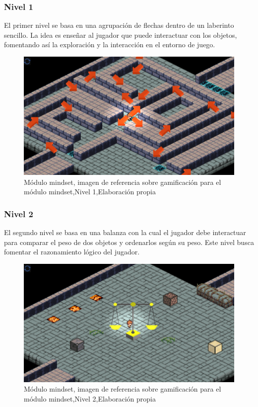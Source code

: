 \subsubsection{Nivel 1}
El primer nivel se basa en una agrupación de flechas dentro de un laberinto sencillo. La idea es enseñar al jugador que puede interactuar con los objetos, fomentando así la exploración y la interacción en el entorno de juego.

\begin{figure}[H]
  \centering
  \includegraphics[width=0.7\linewidth]{Imagenes/Nivel1.png}
  \caption{Módulo mindset, imagen de referencia sobre gamificación para el módulo mindset,Nivel 1,Elaboración propia}
  \label{fig:imagen1mindset}
\end{figure}


\subsubsection{Nivel 2}

El segundo nivel se basa en una balanza con la cual el jugador debe interactuar para comparar el peso de dos objetos y ordenarlos según su peso. Este nivel busca fomentar el razonamiento lógico del jugador.

\begin{figure}[H]
  \centering
  \includegraphics[width=0.7\linewidth]{Imagenes/Nivel2.png}
  \caption{Módulo mindset, imagen de referencia sobre gamificación para el módulo mindset,Nivel 2,Elaboración propia}
  \label{fig:imagen1mindset}
\end{figure}

